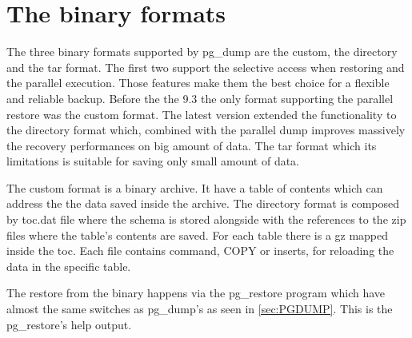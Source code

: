 \section{The binary formats}
\label{sec:PGDUMPBINFMT}
The three binary formats supported by pg\_dump are the custom, the directory and the tar format. 
The first two support the selective access when restoring and the parallel execution. Those features 
make them the best choice for a flexible and reliable backup. Before the the 9.3 the only format supporting 
the parallel restore was the custom format. The latest version extended the functionality to the directory 
format which, combined with the parallel dump improves massively the recovery performances on big amount of 
data. The tar format which its limitations is suitable for saving only small amount of data. \newline

The custom format is a binary archive. It have a table of contents which can address the the data saved 
inside the archive. The directory format is composed by toc.dat file where the schema is stored alongside 
with the references to the zip files where the table's contents are saved. For each table there is a gz 
mapped inside the toc. Each file contains  command, COPY  or inserts, for reloading the data in the 
specific table.\newline


The restore from the binary happens via the pg\_restore program which have almost the same switches 
as pg\_dump's as seen in \ref{sec:PGDUMP}. This is the pg\_restore's help output.
\newline 

